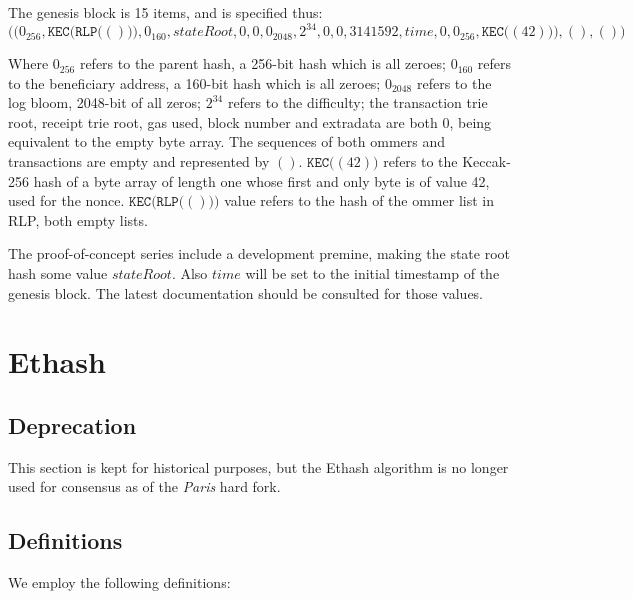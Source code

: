 \documentclass[9pt,oneside]{amsart}
\begin{document}
The genesis block is 15 items, and is specified thus:
\begin{equation}
\big( \big( 0_{256}, \mathtt{KEC}\big(\mathtt{RLP}\big( () \big)\big), 0_{160}, stateRoot, 0, 0, 0_{2048}, 2^{34}, 0, 0, 3141592, time, 0, 0_{256},  \mathtt{KEC}\big( (42) \big) \big), (), () \big)
\end{equation}

Where $0_{256}$ refers to the parent hash, a 256-bit hash which is all zeroes; $0_{160}$ refers to the beneficiary address, a 160-bit hash which is all zeroes; $0_{2048}$ refers to the log bloom, 2048-bit of all zeros; $2^{34}$ refers to the difficulty; the transaction trie root, receipt trie root, gas used, block number and extradata are both $0$, being equivalent to the empty byte array. The sequences of both ommers and transactions are empty and represented by $()$. $\mathtt{KEC}\big( (42) \big)$ refers to the Keccak-256 hash of a byte array of length one whose first and only byte is of value 42, used for the nonce. $\mathtt{KEC}\big(\mathtt{RLP}\big( () \big)\big)$ value refers to the hash of the ommer list in RLP, both empty lists.

The proof-of-concept series include a development premine, making the state root hash some value $stateRoot$. Also $time$ will be set to the initial timestamp of the genesis block. The latest documentation should be consulted for those values.

\section{Ethash}\label{app:ethash}
\subsection{Deprecation}
This section is kept for historical purposes, but the Ethash algorithm is no longer used for consensus as of the \textit{Paris} hard fork.

\subsection{Definitions}
We employ the following definitions:
\end{document}
